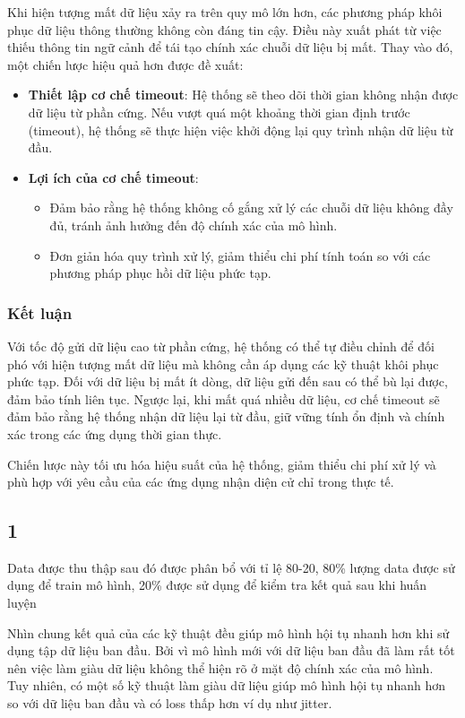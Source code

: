 Khi hiện tượng mất dữ liệu xảy ra trên quy mô lớn hơn, các phương pháp khôi phục dữ liệu thông thường không còn đáng tin cậy. Điều này xuất phát từ việc thiếu thông tin ngữ cảnh để tái tạo chính xác chuỗi dữ liệu bị mất. Thay vào đó, một chiến lược hiệu quả hơn được đề xuất:
\begin{itemize}
    \item \textbf{Thiết lập cơ chế timeout}: Hệ thống sẽ theo dõi thời gian không nhận được dữ liệu từ phần cứng. Nếu vượt quá một khoảng thời gian định trước (timeout), hệ thống sẽ thực hiện việc khởi động lại quy trình nhận dữ liệu từ đầu.
    \item \textbf{Lợi ích của cơ chế timeout}:
    \begin{itemize}
        \item Đảm bảo rằng hệ thống không cố gắng xử lý các chuỗi dữ liệu không đầy đủ, tránh ảnh hưởng đến độ chính xác của mô hình.
        \item Đơn giản hóa quy trình xử lý, giảm thiểu chi phí tính toán so với các phương pháp phục hồi dữ liệu phức tạp.
    \end{itemize}
\end{itemize}

\subsubsection{Kết luận}

Với tốc độ gửi dữ liệu cao từ phần cứng, hệ thống có thể tự điều chỉnh để đối phó với hiện tượng mất dữ liệu mà không cần áp dụng các kỹ thuật khôi phục phức tạp. Đối với dữ liệu bị mất ít dòng, dữ liệu gửi đến sau có thể bù lại được, đảm bảo tính liên tục. Ngược lại, khi mất quá nhiều dữ liệu, cơ chế timeout sẽ đảm bảo rằng hệ thống nhận dữ liệu lại từ đầu, giữ vững tính ổn định và chính xác trong các ứng dụng thời gian thực.

Chiến lược này tối ưu hóa hiệu suất của hệ thống, giảm thiểu chi phí xử lý và phù hợp với yêu cầu của các ứng dụng nhận diện cử chỉ trong thực tế.




\subsection{1}
Data được thu thập sau đó được phân bổ với tỉ lệ 80-20, 80\% lượng data được sử dụng để train mô hình, 20\% được sử dụng để kiểm tra kết quả sau khi huấn luyện

Nhìn chung kết quả của các kỹ thuật đều giúp mô hình hội tụ nhanh hơn khi sử dụng tập dữ liệu ban đầu. Bởi vì mô hình mới với dữ liệu ban đầu đã làm rất tốt nên việc làm giàu dữ liệu không thể hiện rõ ở mặt độ chính xác của mô hình. Tuy nhiên, có một số kỹ thuật làm giàu dữ liệu giúp mô hình hội tụ nhanh hơn so với dữ liệu ban đầu và có loss thấp hơn ví dụ như jitter.

